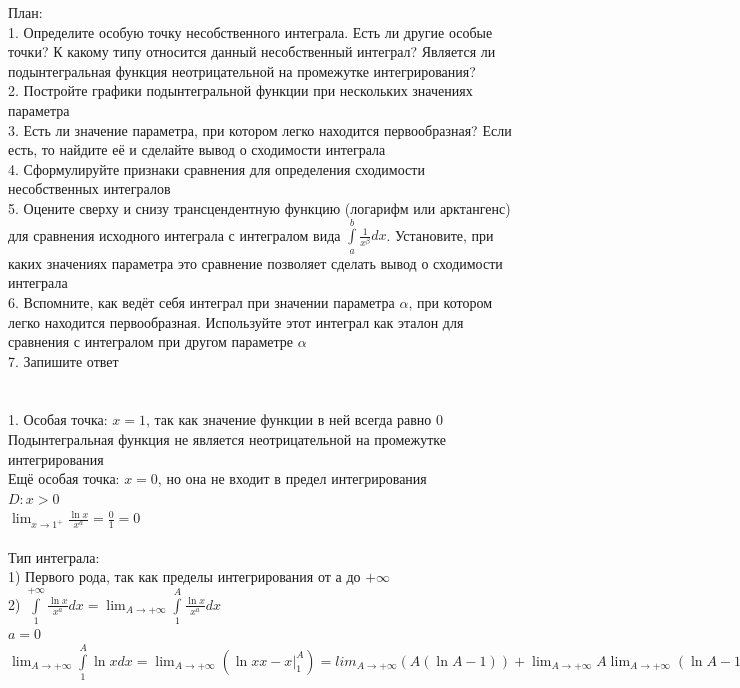 \documentclass{article}
\begin{document}
План:\\
1. Определите особую точку несобственного интеграла. Есть ли другие особые точки? К какому типу относится данный несобственный интеграл? Является ли подынтегральная функция неотрицательной на промежутке интегрирования?\\
2. Постройте графики подынтегральной функции при нескольких значениях параметра\\
3. Есть ли значение параметра, при котором легко находится первообразная? Если есть, то найдите её и сделайте вывод о сходимости интеграла\\
4. Сформулируйте признаки сравнения для определения сходимости несобственных интегралов\\
5. Оцените сверху и снизу трансцендентную функцию (логарифм или арктангенс) для сравнения исходного интеграла с интегралом вида $ \int\limits^b_a \frac{1}{x^{\beta}}dx $. Установите, при каких значениях параметра это сравнение позволяет сделать вывод о сходимости интеграла\\
6. Вспомните, как ведёт себя интеграл при значении параметра $ \alpha $, при котором легко находится первообразная. Используйте этот интеграл как эталон для сравнения с интегралом при другом параметре $ \alpha $ \\
7. Запишите ответ\\
\\\\
1. Особая точка: $ x = 1 $, так как значение функции в ней всегда равно $ 0 $\\
Подынтегральная функция не является неотрицательной на промежутке интегрирования\\
Ещё особая точка: $ x = 0 $, но она не входит в предел интегрирования\\
$ D: x > 0 $\\
$ \lim_{x\to 1^{+}} \frac{\ln{x}}{x^a} = \frac{0}{1} = 0 $\\\\
Тип интеграла:\\
1) Первого рода, так как пределы интегрирования от $ а $ до $ +\infty $\\
2) $ \int\limits^{+\infty}_{1} \frac{\ln{x}}{x^a}dx = \lim_{A\to +\infty} \int\limits^A_1 \frac{\ln{x}}{x^a}dx $\\
$ a = 0 $\\
$ \lim_{A\to +\infty} \int\limits^A_1 \ln{x}dx = \lim_{A\to +\infty}(\ln{x}x - x |^A_1) = lim_{A\to +\infty} (A (\ln{A} - 1)) + \lim_{A\to +\infty} A \lim_{A\to +\infty} (\ln{A} - 1) + 1 = +\infty $\\
\end{document}
